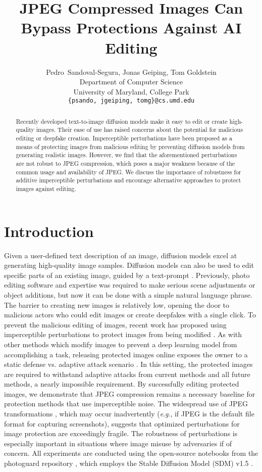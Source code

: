 \documentclass{article} %
\title{JPEG Compressed Images Can Bypass Protections Against AI Editing}
\author{Pedro~Sandoval-Segura, Jonas Geiping, Tom Goldstein\\
Department of Computer Science\\
University of Maryland, College Park\\
\texttt{\{psando, jgeiping, tomg\}@cs.umd.edu} \\
}
\newcommand{\eg}{\textit{e}.\textit{g}.}
\begin{document}
\maketitle

\begin{abstract}
Recently developed text-to-image diffusion models make it easy to edit or create high-quality images. Their ease of use has raised concerns about the potential for malicious editing or deepfake creation. Imperceptible perturbations have been proposed as a means of protecting images from malicious editing by preventing diffusion models from generating realistic images. However, we find that the aforementioned perturbations are not robust to JPEG compression, which poses a major weakness because of the common usage and availability of JPEG. We discuss the importance of robustness for additive imperceptible perturbations and encourage alternative approaches to protect images against editing. 


\end{abstract}

\section{Introduction}

Given a user-defined text description of an image, diffusion models \citep{ho2020denoising, rombach2022high} excel at generating high-quality image samples. Diffusion models can also be used to edit specific parts of an existing image, guided by a text-prompt \citep{rombach2022high}. Previously, photo editing software and expertise was required to make serious scene adjustments or object additions, but now it can be done with a simple natural language phrase. The barrier to creating new images is relatively low, opening the door to malicious actors who could edit images or create deepfakes with a single click. To prevent the malicious editing of images, recent work has proposed using imperceptible perturbations to protect images from being modified \citep{salman2023raising, shan2023glaze}. As with other methods which modify images to prevent a deep learning model from accomplishing a task, releasing protected images online exposes the owner to a static defense vs. adaptive attack scenario \citep{radiya-dixit2021data}. In this setting, the protected images are required to withstand adaptive attacks from current methods and all future methods, a nearly impossible requirement. By successfully editing protected images, we demonstrate that JPEG compression remains a necessary baseline for protection methods that use imperceptible noise. The widespread use of JPEG transformations \citep{w3techs}, which may occur inadvertently (\eg, if JPEG is the default file format for capturing screenshots), suggests that optimized perturbations for image protection are exceedingly fragile. The robustness of perturbations is especially important in situations where image misuse by adversaries if of concern. All experiments are conducted using the open-source notebooks from the photoguard repository \citep{salman2023raising}, which employs the Stable Diffusion Model (SDM) v1.5 \citep{rombach2022high}.
\end{document}
